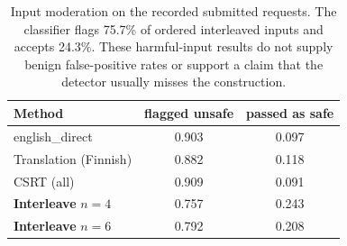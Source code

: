 \begin{table}[t]\centering
\caption{Input moderation on the recorded submitted requests. The classifier flags 75.7\% of ordered interleaved inputs and accepts 24.3\%. These harmful-input results do not supply benign false-positive rates or support a claim that the detector usually misses the construction.}
\label{tab:detect}
\begin{tabular}{l cc}\toprule
Method & flagged unsafe & passed as safe\\\midrule
english\_direct & 0.903 & 0.097 \\
Translation (Finnish) & 0.882 & 0.118 \\
CSRT (all) & 0.909 & 0.091 \\
\textbf{Interleave} $n{=}4$ & 0.757 & 0.243 \\
\textbf{Interleave} $n{=}6$ & 0.792 & 0.208 \\
\bottomrule\end{tabular}\end{table}
